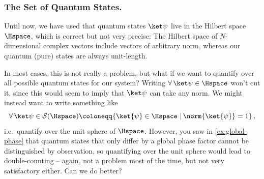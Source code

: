     \subsubsection{The Set of Quantum States.}
      Until now, we have used that quantum states $\ket\psi$ live in the Hilbert
        space $\Hspace$, which is correct but not very precise: The
        Hilbert space of $N$-dimensional complex vectors include vectors of arbitrary
        norm, whereas our quantum (pure) states are always unit-length. 
        
      In most cases, this is not really a problem, but what if we want to quantify over
        all possible quantum states for our system? Writing $\forall\, \ket\psi \in \Hspace$ 
        won't cut it, since this would seem to imply that $\ket\psi$ can take
        any norm.
        We might instead want to write something like
        \[
          \forall\, \ket\psi \in \mathcal{S}(\Hspace) \coloneqq 
          \{ \ket{\psi} \in \Hspace\ |\, \norm{\ket{\psi}} = 1 \}\, ,
        \]
        i.e.\ quantify over the unit sphere of $\Hspace$.
        However, you saw in \cref{ex:global-phase} that quantum states that only
        differ by a global phase factor cannot be distinguished by observation, so
        quantifying over the unit sphere would lead to double-counting -- again,
        not a problem most of the time, but not very satisfactory either. 
        Can we do better? 

